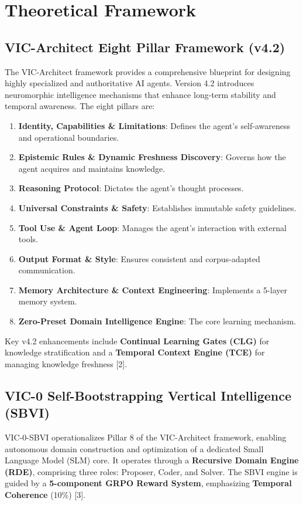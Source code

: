 \documentclass[11pt,a4paper]{article}
\begin{document}
\section{Theoretical Framework}
\subsection{VIC-Architect Eight Pillar Framework (v4.2)}
The VIC-Architect framework provides a comprehensive blueprint for designing highly specialized and authoritative AI agents. Version 4.2 introduces neuromorphic intelligence mechanisms that enhance long-term stability and temporal awareness. The eight pillars are:
\begin{enumerate}
    \item \textbf{Identity, Capabilities \& Limitations}: Defines the agent's self-awareness and operational boundaries.
    \item \textbf{Epistemic Rules \& Dynamic Freshness Discovery}: Governs how the agent acquires and maintains knowledge.
    \item \textbf{Reasoning Protocol}: Dictates the agent's thought processes.
    \item \textbf{Universal Constraints \& Safety}: Establishes immutable safety guidelines.
    \item \textbf{Tool Use \& Agent Loop}: Manages the agent's interaction with external tools.
    \item \textbf{Output Format \& Style}: Ensures consistent and corpus-adapted communication.
    \item \textbf{Memory Architecture \& Context Engineering}: Implements a 5-layer memory system.
    \item \textbf{Zero-Preset Domain Intelligence Engine}: The core learning mechanism.
\end{enumerate}

Key v4.2 enhancements include \textbf{Continual Learning Gates (CLG)} for knowledge stratification and a \textbf{Temporal Context Engine (TCE)} for managing knowledge freshness [2].

\subsection{VIC-0 Self-Bootstrapping Vertical Intelligence (SBVI)}
VIC-0-SBVI operationalizes Pillar 8 of the VIC-Architect framework, enabling autonomous domain construction and optimization of a dedicated Small Language Model (SLM) core. It operates through a \textbf{Recursive Domain Engine (RDE)}, comprising three roles: Proposer, Coder, and Solver. The SBVI engine is guided by a \textbf{5-component GRPO Reward System}, emphasizing \textbf{Temporal Coherence} (10\%) [3].
\end{document}
